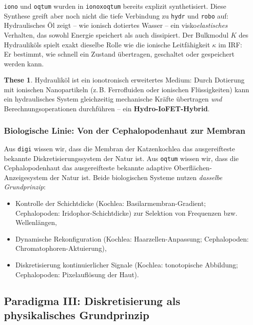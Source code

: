 ﻿\documentclass[a4paper,12pt]{scrreprt}
\theoremstyle{definition}
\newtheorem{these}{These}[section]
\begin{document}
\texttt{iono} und \texttt{oqtum} wurden in \texttt{ionoxoqtum} bereits
explizit synthetisiert. Diese Synthese greift aber noch nicht die tiefe
Verbindung zu \texttt{hydr} und \texttt{robo} auf: Hydraulisches Öl
zeigt -- wie ionisch dotiertes Wasser -- ein visko\emph{elastisches}
Verhalten, das sowohl Energie speichert als auch dissipiert. Der Bulkmodul
$K$ des Hydrauliköls spielt exakt dieselbe Rolle wie die ionische
Leitfähigkeit $\kappa$ im IRF: Er bestimmt, wie schnell ein Zustand
übertragen, geschaltet oder gespeichert werden kann.

\begin{these}
  Hydrauliköl ist ein ionotronisch erweitertes Medium: Durch Dotierung
  mit ionischen Nanopartikeln (z.\,B. Ferrofluiden oder ionischen
  Flüssigkeiten) kann ein hydraulisches System gleichzeitig mechanische
  Kräfte übertragen \emph{und} Berechnungsoperationen durchführen --
  ein \textbf{Hydro-IoFET-Hybrid}.
\end{these}

\subsubsection{Biologische Linie: Von der Cephalopodenhaut zur Membran}

Aus \texttt{digi} wissen wir, dass die Membran der Katzenkochlea das
ausgereifteste bekannte Diskretisierungssystem der Natur ist. Aus
\texttt{oqtum} wissen wir, dass die Cephalopodenhaut das ausgereifteste
bekannte adaptive Oberflächen-Anzeigesystem der Natur ist. Beide
biologischen Systeme nutzen \emph{dasselbe Grundprinzip}:

\begin{itemize}
  \item Kontrolle der Schichtdicke (Kochlea: Basilarmembran-Gradient;
    Cephalopoden: Iridophor-Schichtdicke) zur Selektion von
    Frequenzen bzw. Wellenlängen,
  \item Dynamische Rekonfiguration (Kochlea: Haarzellen-Anpassung;
    Cephalopoden: Chro\-matophoren-Aktuierung),
  \item Diskretisierung kontinuierlicher Signale (Kochlea:
    tonotopische Abbildung; Cephalopoden: Pixelauflösung der Haut).
\end{itemize}

\subsection{Paradigma III: Diskretisierung als physikalisches Grundprinzip}
\label{ssec:paradigma3}
\end{document}
